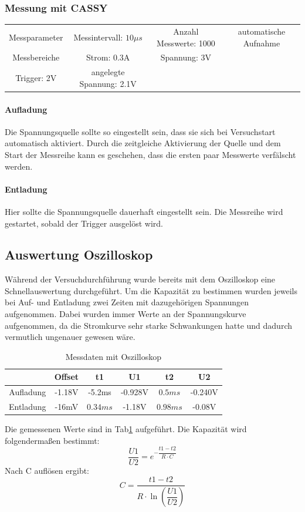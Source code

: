 \documentclass[12pt,a4paper]{article}
\begin{document}
\subsubsection{Messung mit CASSY}
\begin{tabular}{c c c c}
Messparameter & Messintervall: $10\mu s$  & Anzahl Messwerte: 1000 & automatische Aufnahme \\ 
Messbereiche & Strom: 0.3A & Spannung: 3V \\
Trigger: 2V & angelegte Spannung: 2.1V\\
\end{tabular} 
\paragraph{Aufladung}
Die Spannungsquelle sollte so eingestellt sein, dass sie sich bei Versuchstart automatisch aktiviert. Durch die zeitgleiche Aktivierung der Quelle und dem Start der Messreihe kann es geschehen, dass die ersten paar Messwerte verfälscht werden.
\paragraph{Entladung}
Hier sollte die Spannungsquelle dauerhaft eingestellt sein. Die Messreihe wird gestartet, sobald der Trigger ausgelöst wird.
\newpage
\subsection{Auswertung Oszilloskop}
Während der Versuchdurchführung wurde bereits mit dem Oszilloskop eine Schnellauswertung durchgeführt.
Um die Kapazität zu bestimmen wurden jeweils bei Auf- und Entladung zwei Zeiten mit dazugehörigen Spannungen aufgenommen. Dabei wurden immer Werte an der Spannungskurve aufgenommen, da die Stromkurve sehr starke Schwankungen hatte und dadurch vermutlich ungenauer gewesen wäre.\\
\begin{table}[H]
\begin{center}
\begin{tabular}{|c|c|c|c|c|c|}
\hline 
 & Offset & t1 & U1 & t2 & U2 \\ 
\hline 
Aufladung & -1.18V & -5.2ms & -0.928V & $0.5ms$ & -0.240V \\ 
\hline 
Entladung & -16mV & $0.34ms$ & -1.18V & $0.98ms$ & -0.08V \\ 
\hline 
\end{tabular} 
\end{center}
\label{tab:Kond_Osz}
\caption{Messdaten mit Oszilloskop}
\end{table}
Die gemessenen Werte sind in Tab\ref{tab:Kond_Osz} aufgeführt. Die Kapazität wird folgendermaßen bestimmt:
\begin{equation}
\dfrac{U1}{U2} = e^{-\dfrac{t1-t2}{R\cdot C}}
\end{equation}
Nach C auflösen ergibt:
\begin{equation}
C = \dfrac{t1-t2}{R\cdot \ln(\dfrac{U1}{U2})}
\end{equation}
\end{document}
